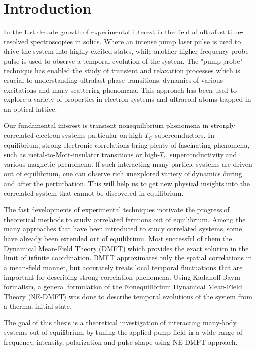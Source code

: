 \chapter{Introduction}


In the last decade growth of experimental interest in the field of ultrafast time-resolved spectroscopies in solids. Where an intense
pump laser pulse is used to drive the system into highly
excited states, while another higher frequency probe pulse is used to observe a temporal evolution of the system.
The "pump-probe" technique has enabled the study of transient and relaxation processes which is crucial to understanding ultrafast phase transitions, dynamics of various excitations and many scattering phenomena. This approach has been used to explore a variety of properties in electron systems and ultracold atoms trapped in an optical lattice.

Our fundamental interest is transient nonequilibrium phenomena in strongly correlated
electron systems particular on high-$T_C$ superconductors.
In equilibrium, strong electronic correlations bring plenty of fascinating phenomena,
such as metal-to-Mott-insulator transitions or high-$T_C$ superconductivity and various magnetic phenomena.
If such interacting many-particle systems are
driven out of equilibrium, one can observe rich unexplored variety of dynamics during and
after the perturbation. This will help us to get new physical insights into the correlated system that cannot be discovered in equilibrium.

The fast developments of experimental techniques motivate the progress of theoretical methods to study correlated fermions out of equilibrium. 
Among the many approaches that have been introduced
to study correlated systems, some have already been extended out of equilibrium.
Most successful of them the Dynamical Mean-Field Theory (DMFT) \citep{RevModPhys.68.13,Kotliar} which provides the exact solution in the limit of infinite coordination. 
DMFT approximates only the spatial correlations in a mean-field manner, but accurately treats local temporal fluctuations that are important for describing
strong-correlation phenomena. 
Using Kadanoff-Baym formalism, a general formulation of the Nonequilibrium Dynamical Mean-Field Theory (NE-DMFT) \citep{PhysRevLett.97.266408} was done to describe temporal evolutions of the system from a thermal initial state.

The goal of this thesis is a theoretical investigation
of interacting many-body systems out of equilibrium by tuning the applied pump field in a wide range of frequency, intensity, polarization and pulse shape using NE-DMFT approach.

